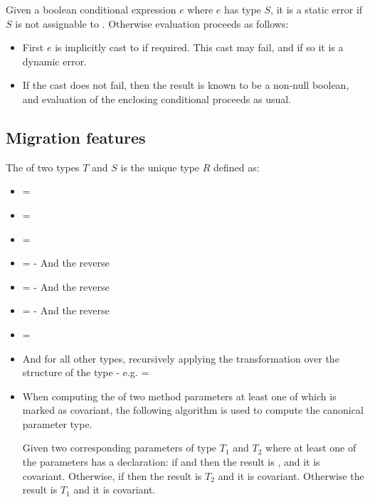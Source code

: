 \documentclass[makeidx]{article}
\begin{document}
{Given a boolean conditional expression $e$ where $e$ has type $S$, it is a
static error if $S$ is not assignable to .
Otherwise evaluation proceeds as follows:

\begin{itemize}
\item First $e$ is implicitly cast to  if required.
  This cast may fail, and if so it is a dynamic error.
\item If the cast does not fail, then the result is known to be a non-null
    boolean, and evaluation of the enclosing conditional proceeds as usual.
\end{itemize}

\subsection{Migration features}

The \NnbdTopMergeName{} of two types $T$ and $S$ is the unique type $R$ defined
as:

\begin{itemize}
\item {} = 
\item \NnbdTopMerge{\DYNAMIC}{\DYNAMIC} = \code{\DYNAMIC}
\item \NnbdTopMerge{\VOID}{\VOID} = \code{\VOID}
\item {} = 
   - And the reverse
\item \NnbdTopMerge{\DYNAMIC}{\VOID} = 
   - And the reverse
\item {} = 
   - And the reverse
\item {} = 
\item And for all other types, recursively applying the transformation over the
  structure of the type
  - e.g.  = 
\item When computing the \NnbdTopMergeName{} of two method parameters at least one of
  which is marked as covariant, the following algorithm is used to compute the
  canonical parameter type.

  Given two corresponding parameters of type $T_1$ and $T_2$ where at least
  one of the parameters has a \COVARIANT{} declaration:
  if  and  then the result is ,
     and it is covariant.
  Otherwise, if  then the result is $T_2$ and it is covariant.
  Otherwise the result is $T_1$ and it is covariant.
\end{itemize}

}
\end{document}
